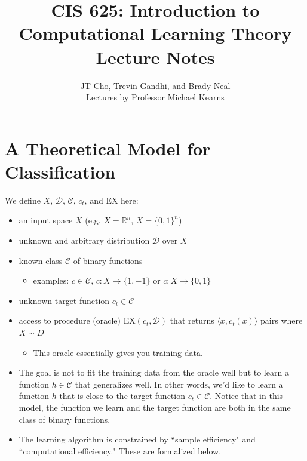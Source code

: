 \documentclass{article}
\title{CIS 625: Introduction to Computational Learning Theory \\ Lecture Notes}
\author{JT Cho, Trevin Gandhi, and Brady Neal \\
Lectures by Professor Michael Kearns}
\date{}
\begin{document}
\maketitle

\tableofcontents
\clearpage

\section{A Theoretical Model for Classification}

We define $X$, $\mathcal{D}$, $\mathcal{C}$, $c_t$, and EX here:

\begin{itemize}

    \item
    an input space $X$ (e.g. $X = \mathbb{R}^n$, $X = \{0, 1\}^n$)

    \item
    unknown and arbitrary distribution $\mathcal{D}$ over $X$

    \item
    known class $\mathcal{C}$ of binary functions
    \begin{itemize}
        \item
        examples: $c \in \mathcal{C}$, $c : X \rightarrow \{1, -1\}$ or $c : X \rightarrow \{0, 1\}$
    \end{itemize}

    \item
    unknown target function $c_t \in \mathcal{C}$

    \item
    access to procedure (oracle) EX$(c_t, \mathcal{D})$ that returns $\langle x, c_t(x) \rangle$ pairs where $X \sim D$
    \begin{itemize}
        \item
        This oracle essentially gives you training data.
    \end{itemize}

    \item
    The goal is not to fit the training data from the oracle well but to learn a function $h \in \mathcal{C}$ that generalizes well. In other words, we'd like to learn a function $h$ that is close to the target function $c_t \in \mathcal{C}$. Notice that in this model, the function we learn and the target function are both in the same class of binary functions.

    \item
    The learning algorithm is constrained by ``sample efficiency" and ``computational efficiency." These are formalized below.

\end{itemize}
\end{document}
